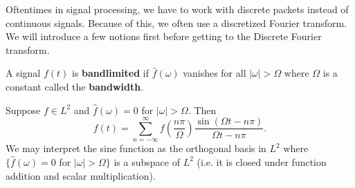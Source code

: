 
Oftentimes in signal processing, we have to work with
discrete packets instead of continuous signals. Because of
this, we often use a discretized Fourier transform. We will
introduce a few notions first before getting to the Discrete
Fourier transform.

\begin{defn}
A signal $f(t)$ is \textbf{bandlimited} if
$\widehat{f}(\omega)$ vanishes for all $|\omega|>\Omega$
where $\Omega$ is a constant called the \textbf{bandwidth}.
\end{defn}

\begin{samplingthm}
Suppose $f\in L^2$ and $\widehat{f}(\omega)=0$ for
$|\omega|>\Omega$. Then
\begin{equation}
f(t) =
\sum^{\infty}_{n=-\infty}f\left(\frac{n\pi}{\Omega}\right)\frac{\sin(\Omega t - n\pi)}{\Omega t - n\pi}.
\end{equation}
We may interpret the sine function as the orthogonal basis in
$L^2$ where $\{\widehat{f}(\omega)=0$ for $|\omega|>\Omega\}$ is
a subspace of $L^{2}$ (i.e. it is closed under function addition
and scalar multiplication).
\end{samplingthm}

